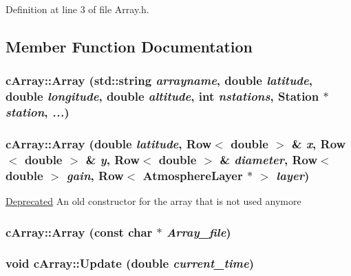 Definition at line 3 of file Array.h.



\subsection{Member Function Documentation}
\hypertarget{classcArray_a8353005225736b072bb5be04afc8c6b9}{
\subsubsection[{Array}]{\setlength{\rightskip}{0pt plus 5cm}cArray::Array (std::string {\em arrayname}, \/  double {\em latitude}, \/  double {\em longitude}, \/  double {\em altitude}, \/  int {\em nstations}, \/  {\bf Station} $\ast$ {\em station}, \/   {\em ...})}}
\label{classcArray_a8353005225736b072bb5be04afc8c6b9}
\hypertarget{classcArray_a2178b02ce3799a716d7fdf245439d4b1}{
\subsubsection[{Array}]{\setlength{\rightskip}{0pt plus 5cm}cArray::Array (double {\em latitude}, \/  {\bf Row}$<$ double $>$ \& {\em x}, \/  {\bf Row}$<$ double $>$ \& {\em y}, \/  {\bf Row}$<$ double $>$ \& {\em diameter}, \/  {\bf Row}$<$ double $>$ {\em gain}, \/  {\bf Row}$<$ {\bf AtmosphereLayer} $\ast$ $>$ {\em layer})}}
\label{classcArray_a2178b02ce3799a716d7fdf245439d4b1}
\begin{Desc}
\item[\hyperlink{deprecated__deprecated000001}{Deprecated}]An old constructor for the array that is not used anymore \end{Desc}
\hypertarget{classcArray_a549be680a7c2a2ff261a5e3e3b57e839}{
\subsubsection[{Array}]{\setlength{\rightskip}{0pt plus 5cm}cArray::Array (const char $\ast$ {\em Array\_\-file})}}
\label{classcArray_a549be680a7c2a2ff261a5e3e3b57e839}
\hypertarget{classcArray_afa7a4038ae07a8d887772125a84e77a8}{
\subsubsection[{Update}]{\setlength{\rightskip}{0pt plus 5cm}void cArray::Update (double {\em current\_\-time})}}
\label{classcArray_afa7a4038ae07a8d887772125a84e77a8}


